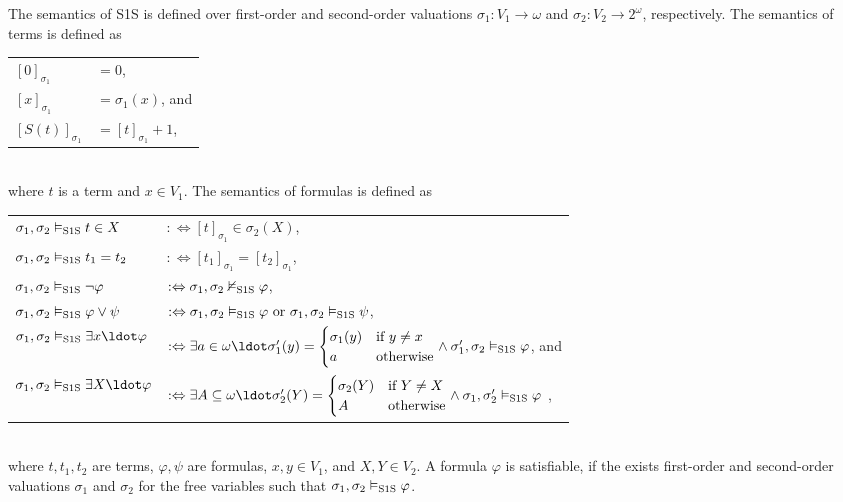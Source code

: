 \documentclass{LMCS}
\newcommand{\modelssos}{\vDash_\text{\rm S1S}}
\newcommand{\nmodelssos}{\nvDash_\text{\rm S1S}}
\theoremstyle{plain}\newtheorem{theorem}[thm]{Theorem}
\theoremstyle{plain}\newtheorem{lemma}[thm]{Lemma}
\theoremstyle{plain}\newtheorem{proposition}[thm]{Proposition}
\theoremstyle{plain}\newtheorem{corollary}[thm]{Corollary}
\theoremstyle{definition}\newtheorem{definition}{Definition}[section]
\begin{document}
The semantics of S1S is defined over first-order and second-order valuations $\sigma_1 : V_1 \rightarrow \omega$ and $\sigma_2 : V_2 \rightarrow 2^\omega$, respectively.
The semantics of terms is defined as\smallskip\\
\begin{tabular}{L l}
  $[0]_{\sigma_1}$ & $= 0$,\\[1pt]
  $[x]_{\sigma_1}$ & $= \sigma_1(x)$, and\\[1pt]
  $[S(t)]_{\sigma_1}$ & $= [t]_{\sigma_1} + 1$\enspace,
\end{tabular}\smallskip\\
where $t$ is a term and $x \in V_1$.
The semantics of formulas is defined as\smallskip\\
\begin{tabular}{L l}
  $\sigma_1,\sigma_2 \modelssos t \in X$ & $:\Leftrightarrow [t]_{\sigma_1} \in \sigma_2(X)$,\\[1pt]
  $\sigma_1,\sigma_2 \modelssos t_1 = t_2$ & $:\Leftrightarrow [t_1]_{\sigma_1} = [t_2]_{\sigma_1}$,\\[1pt]
  $\sigma_1,\sigma_2 \modelssos \neg \varphi$ & $:\Leftrightarrow \sigma_1,\sigma_2 \nmodelssos \varphi$,\\[1pt]
  $\sigma_1,\sigma_2 \modelssos \varphi \lor \psi$ & $:\Leftrightarrow \sigma_1,\sigma_2 \modelssos \varphi \text{ or } \sigma_1,\sigma_2 \modelssos \psi$,\\[1pt]
  $\sigma_1,\sigma_2 \modelssos \exists x \ldot \varphi$ & $:\Leftrightarrow \exists a \in \omega \ldot \sigma'_1(y) = \begin{cases} \sigma_1(y) & \text{if } y \neq x \\ a & \text{otherwise} \end{cases} \land \sigma'_1,\sigma_2 \modelssos \varphi$, and\\[1pt]
  $\sigma_1,\sigma_2 \modelssos \exists X \ldot \varphi$ & $:\Leftrightarrow \exists A \subseteq \omega \ldot \sigma'_2(Y) = \begin{cases} \sigma_2(Y) & \text{if } Y \neq X \\ A & \text{otherwise} \end{cases} \land \sigma_1,\sigma'_2 \modelssos \varphi$ \enspace,
\end{tabular}\smallskip\\
where $t,t_1,t_2$ are terms, $\varphi,\psi$ are formulas, $x,y \in V_1$, and $X,Y \in V_2$.
A formula $\varphi$ is satisfiable, if the exists first-order and second-order valuations $\sigma_1$ and $\sigma_2$ for the free variables such that $\sigma_1,\sigma_2 \modelssos \varphi$.
\end{document}

